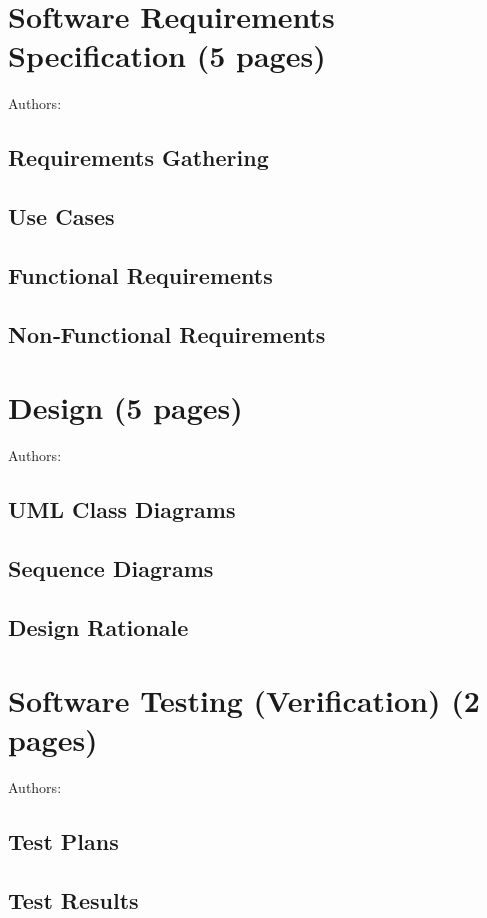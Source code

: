 \documentclass[12pt,a4paper]{article}
\begin{document}
\section{Software Requirements Specification (5 pages)}
Authors:
\label{sec:requirements}
\subsection{Requirements Gathering}

\subsection{Use Cases}

\subsection{Functional Requirements}

\subsection{Non‑Functional Requirements}


\section{Design (5 pages)}
Authors:
\label{sec:design}
\subsection{UML Class Diagrams}

\subsection{Sequence Diagrams}

\subsection{Design Rationale}


\section{Software Testing (Verification) (2 pages)}
Authors:
\label{sec:testing}
\subsection{Test Plans}

\subsection{Test Results}
\end{document}
